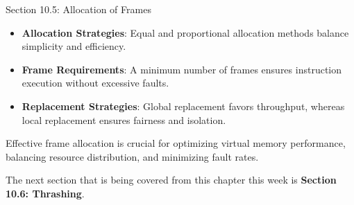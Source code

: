\begin{notes}{Section 10.5: Allocation of Frames}
\begin{highlight}
    \end{highlight}
    
    \begin{highlight}
    
    \begin{itemize}
        \item \textbf{Allocation Strategies}: Equal and proportional allocation methods balance simplicity and efficiency.
        \item \textbf{Frame Requirements}: A minimum number of frames ensures instruction execution without excessive faults.
        \item \textbf{Replacement Strategies}: Global replacement favors throughput, whereas local replacement ensures fairness and isolation.
    \end{itemize}
    
    Effective frame allocation is crucial for optimizing virtual memory performance, balancing resource distribution, and minimizing fault rates.
    
    \end{highlight}
\end{notes}

The next section that is being covered from this chapter this week is \textbf{Section 10.6: Thrashing}.

